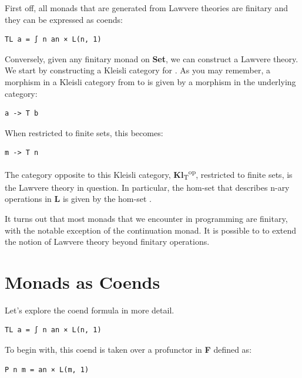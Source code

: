 First off, all monads that are generated from Lawvere theories are
finitary and they can be expressed as coends:

\begin{Verbatim}[commandchars=\\\{\}]
TL a = ∫ n an × L(n, 1)
\end{Verbatim}

Conversely, given any finitary monad  on \textbf{Set}, we can
construct a Lawvere theory. We start by constructing a Kleisli category
for . As you may remember, a morphism in a Kleisli category
from  to  is given by a morphism in the underlying
category:

\begin{Verbatim}[commandchars=\\\{\}]
a -> T b
\end{Verbatim}

When restricted to finite sets, this becomes:

\begin{Verbatim}[commandchars=\\\{\}]
m -> T n
\end{Verbatim}

The category opposite to this Kleisli category,
\textbf{Kl}\textsubscript{T}\textsuperscript{op}, restricted to finite
sets, is the Lawvere theory in question. In particular, the hom-set
 that describes n-ary operations in \textbf{L} is given
by the hom-set .

It turns out that most monads that we encounter in programming are
finitary, with the notable exception of the continuation monad. It is
possible to to extend the notion of Lawvere theory beyond finitary
operations.

\section{Monads as Coends}\label{monads-as-coends}

Let's explore the coend formula in more detail.

\begin{Verbatim}[commandchars=\\\{\}]
TL a = ∫ n an × L(n, 1)
\end{Verbatim}

To begin with, this coend is taken over a profunctor  in
\textbf{F} defined as:

\begin{Verbatim}[commandchars=\\\{\}]
P n m = an × L(m, 1)
\end{Verbatim}


